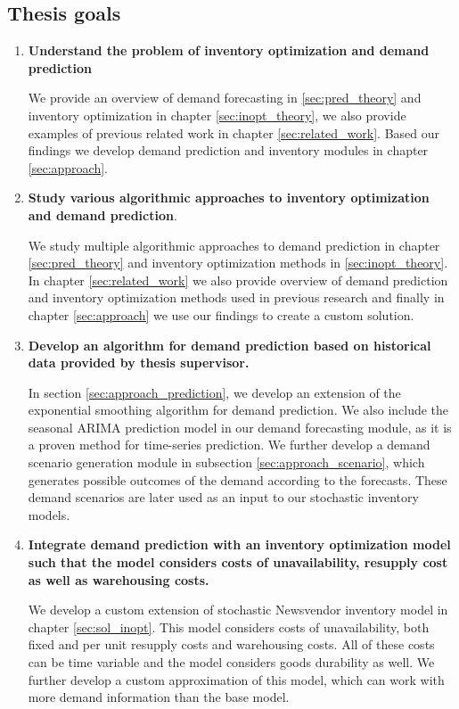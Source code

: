 \documentclass[11pt,a4paper]{article}
\begin{document}
\newpage
\subsection{Thesis goals}
\begin{enumerate}
\item \textbf{Understand the problem of inventory optimization and demand prediction}

We provide an overview of demand forecasting in \ref{sec:pred_theory} and inventory optimization in chapter \ref{sec:inopt_theory}, we also provide examples of previous related work in chapter \ref{sec:related_work}. Based our findings we develop demand prediction and inventory modules in chapter \ref{sec:approach}.
\item \textbf{Study various algorithmic approaches to inventory optimization and demand prediction}.

We study multiple algorithmic approaches to demand prediction in chapter \ref{sec:pred_theory} and inventory optimization methods in \ref{sec:inopt_theory}. In chapter \ref{sec:related_work} we also provide overview of demand prediction and inventory optimization methods used in previous research and finally in chapter \ref{sec:approach} we use our findings to create a custom solution.

\item \textbf{Develop an algorithm for demand prediction based on historical data provided by thesis supervisor.}

In section \ref{sec:approach_prediction}, we develop an extension of the exponential smoothing algorithm for demand prediction. We also include the seasonal ARIMA prediction model in our demand forecasting module, as it is a proven method for time-series prediction.
We further develop a demand scenario generation module in subsection \ref{sec:approach_scenario}, which generates possible outcomes of the demand according to the forecasts. These demand scenarios are later used as an input to our stochastic inventory models.
\item \textbf{Integrate demand prediction with an inventory optimization model such that the model considers costs of unavailability, resupply cost as well as warehousing costs.}

We develop a custom extension of stochastic Newsvendor inventory model in chapter \ref{sec:sol_inopt}. This model considers costs of unavailability, both fixed and per unit resupply costs and warehousing costs. All of these costs can be time variable and the model considers goods durability as well. We further develop a custom approximation of this model, which can work with more demand information than the base model.


\end{enumerate}
\end{document}
